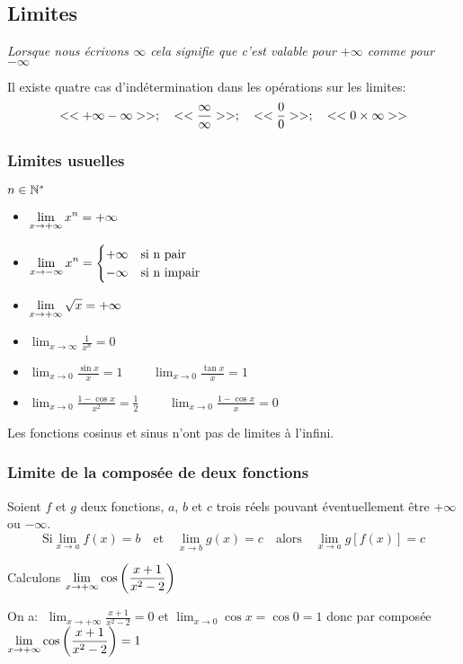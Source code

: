 
\everymath{\displaystyle}



\subsection{Limites}


\textsl{Lorsque nous écrivons $ \infty $ cela signifie que c'est valable pour $ +\infty$ comme pour $-\infty $ }

 Il existe quatre cas d'indétermination dans les opérations sur les limites:
\[ <<+\infty -\infty>>;\quad <<\frac{\infty}{\infty}>>;\quad << \frac{0}{0}>>;\quad <<0\times \infty >> \]
\subsubsection*{Limites usuelles}
 $ n\in\mathbb{N}^* $
\begin{itemize}
\item $ \displaystyle\lim_{x \to +\infty}x^{n}= +\infty$ 
\item $\displaystyle\lim_{x \to -\infty}x^{n}= \begin{cases}
+\infty & \text{si n pair} \\
-\infty & \text{si  n impair}
\end{cases}$ 
\item $\displaystyle \lim_{x \to +\infty}\sqrt{x}=+\infty$ 
\item $\displaystyle \lim_{x \to \infty} \frac{1}{x^{n}}=0$ 
\item $\displaystyle \lim_{x \to 0}\frac{\sin x}{x}=1$  $\qquad \displaystyle \lim_{x \to 0}\frac{\tan x}{x}=1$ 
\item $ \displaystyle\lim_{x \to 0}\frac{1-\cos x}{x^{2}}= \frac{1}{2}$ $\qquad  \displaystyle\lim_{x \to 0}\frac{1-\cos x}{x}= 0$ 

\end{itemize}
\begin{remark}
Les fonctions cosinus et sinus n'ont pas de limites à l'infini.
\end{remark}
\subsubsection*{Limite de la composée de deux fonctions}
\begin{property}
 Soient $f $  et $g$ deux fonctions, $a $, $b$  et  $c$ trois réels pouvant éventuellement être $ +\infty $ ou $ -\infty $. 
\[\text{Si}\displaystyle \lim_{x \to a} f(x) = b \quad \text{et} \quad \displaystyle \lim_{x \to b} g(x) = c \quad \text{alors} \quad \displaystyle \lim_{x \to a} g[f(x)] = c \]
  \end{property}
\begin{example}
 Calculons $\displaystyle \lim_{x \to +\infty} \cos\left(\frac{x+1}{x^{2}-2}\right)$ 
 
On a: $\; \displaystyle \lim_{x \to +\infty} \frac{x+1}{x^{2}-2} = 0 $ et $ \displaystyle \lim_{x \to 0} \cos x = \cos0=1 $ donc  par composée $  \displaystyle\lim_{x \to +\infty}\cos\left(\frac{x+1}{x^{2}-2}\right)=1 $

\end{example}  

